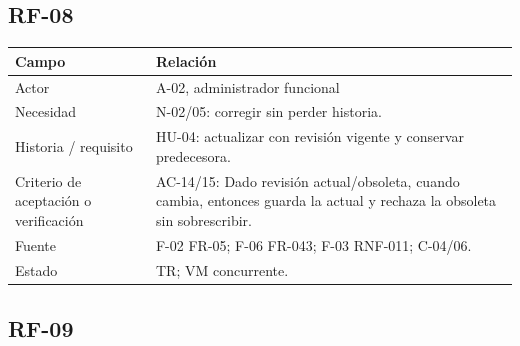 \documentclass[12pt,a4paper]{report}
\begin{document}
\subsection{RF-08}\label{matriz-RF-08}

{\def\LTcaptype{none} %
\begin{longtable}[]{@{}
  >{\raggedright\arraybackslash}p{}
  >{\raggedright\arraybackslash}p{}@{}}
\toprule\noalign{}
\begin{minipage}[b]{\linewidth}\raggedright
Campo
\end{minipage} & \begin{minipage}[b]{\linewidth}\raggedright
Relación
\end{minipage} \\
\midrule\noalign{}
\endhead
\bottomrule\noalign{}
\endlastfoot
Actor & A-02, administrador funcional \\
Necesidad & N-02/05: corregir sin perder historia. \\
Historia / requisito & HU-04: actualizar con revisión vigente y
conservar predecesora. \\
Criterio de aceptación o verificación & AC-14/15: Dado revisión
actual/obsoleta, cuando cambia, entonces guarda la actual y rechaza la
obsoleta sin sobrescribir. \\
Fuente & F-02 FR-05; F-06 FR-043; F-03 RNF-011; C-04/06. \\
Estado & TR; VM concurrente. \\
\end{longtable}
}

\subsection{RF-09}\label{matriz-RF-09}
\end{document}
